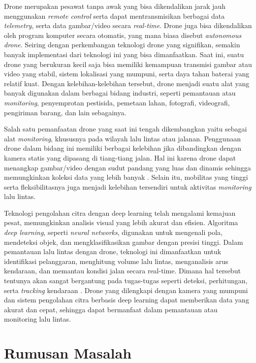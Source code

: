 Drone merupakan pesawat tanpa awak yang bisa dikendalikan jarak jauh menggunakan \emph{remote control} serta dapat mentransmisikan berbagai data \emph{telemetry}, serta data gambar/video secara \emph{real-time}. Drone juga bisa dikendalikan oleh program komputer secara otomatis, yang mana biasa disebut \emph{autonomous drone}. Seiring dengan perkembangan teknologi drone yang signifikan, semakin banyak implementasi dari teknologi ini yang bisa dimanfaatkan. Saat ini, suatu drone yang berukuran kecil saja bisa memiliki kemampuan transmisi gambar atau video yang stabil, sistem lokalisasi yang mumpuni, serta daya tahan baterai yang relatif kuat. Dengan kelebihan-kelebihan tersebut, drone menjadi suatu alat yang banyak digunakan dalam berbagai bidang industri, seperti pemantauan atau \emph{monitoring}, penyemprotan pestisida, pemetaan lahan, fotografi, videografi, pengiriman barang, dan lain sebagainya. 

Salah satu pemanfaatan drone yang saat ini tengah dikembangkan yaitu sebagai alat \emph{monitoring}, khususnya pada wilayah lalu lintas atau jalanan. Penggunaan drone dalam bidang ini memiliki berbagai kelebihan jika dibandingkan dengan kamera statis yang dipasang di tiang-tiang jalan. Hal ini karena drone dapat menangkap gambar/video dengan sudut pandang yang luas dan dinamis sehingga memungkinkan koleksi data yang lebih banyak \cite{LeeSmallDroneSurveillance}. Selain itu, mobilitas yang tinggi serta fleksibilitasnya juga menjadi kelebihan tersendiri untuk aktivitas \emph{monitoring} lalu lintas.

Teknologi pengolahan citra dengan deep learning telah mengalami kemajuan pesat, memungkinkan analisis visual yang lebih akurat dan efisien. Algoritma \emph{deep learning}, seperti \emph{neural networks}, digunakan untuk mengenali pola, mendeteksi objek, dan mengklasifikasikan gambar dengan presisi tinggi. Dalam pemantauan lalu lintas dengan drone, teknologi ini dimanfaatkan untuk identifikasi pelanggaran, menghitung volume lalu lintas, menganalisis arus kendaraan, dan memantau kondisi jalan secara real-time. Dimana hal tersebut tentunya akan sangat bergantung pada tugas-tugas seperti deteksi, perhitungan, serta \emph{tracking} kendaraan \cite{AndreaIEEEAccess}. Drone yang dilengkapi dengan kamera yang mumpuni dan sistem pengolahan citra berbasis deep learning dapat memberikan data yang akurat dan cepat, sehingga dapat bermanfaat dalam pemantauan atau monitoring lalu lintas.

\section{Rumusan Masalah}

